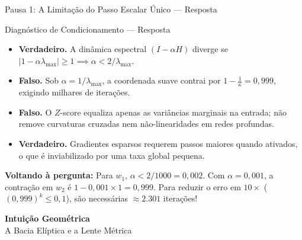 \documentclass[aspectratio=169, 10pt]{beamer}
\newenvironment{callouttip}[1][Dica]{%
  \begin{exampleblock}{#1}%
}{%
  \end{exampleblock}%
}
\newcommand{\cmark}{\textcolor{green!60!black}{\textbf{\ding{51}}}}
\newcommand{\xmark}{\textcolor{red!70!black}{\textbf{\ding{55}}}}
\begin{document}
\begin{frame}{Pausa 1: A Limitação do Passo Escalar Único --- Resposta}
  \begin{callouttip}[Diagnóstico de Condicionamento --- Resposta]
    \begin{itemize}
      \item[\cmark] \textbf{Verdadeiro.} A dinâmica espectral $(I - \alpha H)$ diverge se $|1 - \alpha \lambda_{\max}| \ge 1 \implies \alpha < 2/\lambda_{\max}$.
      \item[\xmark] \textbf{Falso.} Sob $\alpha = 1/\lambda_{\max}$, a coordenada suave contrai por $1 - \frac{1}{\kappa} = 0{,}999$, exigindo milhares de iterações.
      \item[\xmark] \textbf{Falso.} O $Z$-score equaliza apenas as variâncias marginais na entrada; não remove curvaturas cruzadas nem não-linearidades em redes profundas.
      \item[\cmark] \textbf{Verdadeiro.} Gradientes esparsos requerem passos maiores quando ativados, o que é inviabilizado por uma taxa global pequena.
    \end{itemize}
  \end{callouttip}
  \vspace{0.2cm}
  \textbf{Voltando à pergunta:} Para $w_1$, $\alpha < 2/1000 = 0{,}002$. Com $\alpha = 0{,}001$, a contração em $w_2$ é $1 - 0{,}001 \times 1 = 0{,}999$. Para reduzir o erro em $10\times$ ($(0{,}999)^k \le 0{,}1$), são necessárias $\approx \mathbf{2.301}$ iterações!
\end{frame}

\begin{frame}[plain]
  \centering
  \vspace{2cm}
  {\Huge \textcolor{unicampblue}{\textbf{Intuição Geométrica}}}\\
  \vspace{0.5cm}
  {\large \textcolor{unicampteal}{A Bacia Elíptica e a Lente Métrica}}
\end{frame}
\end{document}
